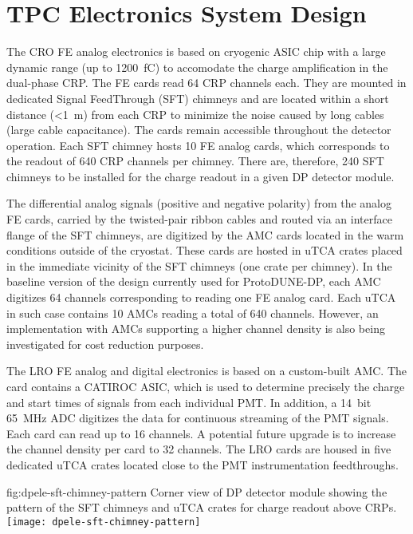 \section{TPC Electronics System Design}
\label{sec:fddp-tpc-elec-design}

The CRO FE analog electronics is based on cryogenic ASIC chip with a large dynamic range (up to \SI{1200}{\femto\coulomb}) to accomodate the charge amplification in the dual-phase CRP. The FE cards read \num{64} CRP channels each. They are mounted in dedicated Signal FeedThrough (SFT) chimneys and are located within a short distance (\SI{<1}{\metre}) from each CRP to minimize the noise caused by long cables (large cable capacitance). The cards remain accessible throughout the detector operation. Each SFT chimney hosts \num{10} FE analog cards, which corresponds to the readout of \num{640} CRP channels per chimney. There are, therefore, \num{240} SFT chimneys to be installed for the charge readout in a given DP detector module.   

The differential analog signals (positive and negative polarity) from the analog FE cards, carried by the twisted-pair ribbon cables and routed via an interface flange of the SFT chimneys, are digitized by the AMC cards located in the warm conditions outside of the cryostat. These cards are hosted in uTCA crates placed in the immediate vicinity of the SFT chimneys (one crate per chimney). In the baseline version of the design currently used for ProtoDUNE-DP, each AMC digitizes \num{64} channels corresponding to reading one FE analog card. Each uTCA in such case contains \num{10} AMCs reading a total of \num{640} channels. However, an implementation with AMCs supporting a higher channel density is also being investigated for cost reduction purposes.

The LRO FE analog and digital electronics is based on a custom-built AMC. The card contains a CATIROC ASIC, which is used to determine precisely the charge and start times of signals from each individual PMT. In addition, a \SI{14}{bit} \SI{65}{MHz} ADC digitizes the data for continuous streaming of the PMT signals. Each card can read up to \num{16} channels. A potential future upgrade is to increase the channel density per card to \num{32} channels. The LRO cards are housed in five dedicated uTCA crates located close to the PMT instrumentation feedthroughs.

\begin{dunefigure}{fig:dpele-sft-chimney-pattern}
{Corner view of DP detector module showing the pattern of the SFT chimneys and uTCA crates for charge readout above CRPs.}
\texttt{[image: dpele-sft-chimney-pattern]}
\end{dunefigure}

